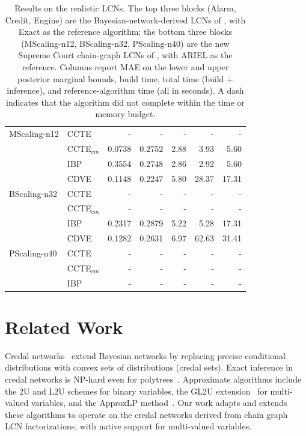 \documentclass{article}
\begin{document}
\begin{table}[t]
{\begin{tabular}{l|l|rr|rrr}
MScaling-n12     & CCTE & - & - & - & - & -\\
     & CCTE$_{cm}$ & 0.0738 & 0.2752 & 2.88 & 3.93 & 5.60  \\
     & IBP & 0.3554 & 0.2748 & 2.86 & 2.92 & 5.60  \\
\hline
     & CDVE & 0.1148 & 0.2247 & 5.80 & 28.37 & 17.31  \\
BScaling-n32     & CCTE & - & - & - & - & -\\
     & CCTE$_{cm}$ & - & - & - & - & -\\
     & IBP & 0.2317 & 0.2879 & 5.22 & 5.28 & 17.31  \\
\hline
     & CDVE & 0.1282 & 0.2631 & 6.97 &  62.63 & 31.41  \\
PScaling-n40 & CCTE & - & - & - & - & -\\
     & CCTE$_{cm}$ & - & - & - & - & -\\
     & IBP & - & - & - & - & -\\
\end{tabular}
}
\caption{Results on the realistic LCNs. The top three blocks (Alarm, Credit, Engine) are the Bayesian-network-derived LCNs of \cite{marinescu2023lcn}, with Exact as the reference algorithm; the bottom three blocks (MScaling-n12, BScaling-n32, PScaling-n40) are the new Supreme Court chain-graph LCNs of \cite{ogburn2020causal}, with ARIEL as the reference. Columns report MAE on the lower and upper posterior marginal bounds, build time, total time (build + inference), and reference-algorithm time (all in seconds). A dash indicates that the algorithm did not complete within the time or memory budget.}
\label{tab:real}
\end{table}

\section{Related Work}
\label{sec-related}

Credal networks~\cite{cozman2000credal} extend Bayesian networks by replacing precise conditional distributions with convex sets of distributions (credal sets). Exact inference in credal networks is NP-hard even for polytrees~\cite{maua2020ijar}. Approximate algorithms include the 2U and L2U schemes \cite{l2u} for binary variables, the GL2U extension~\cite{antonucci2010} for multi-valued variables, and the ApproxLP method~\cite{antonucci2015approxlp}. Our work adapts and extends these algorithms to operate on the credal networks derived from chain graph LCN factorizations, with native support for multi-valued variables.
\end{document}
